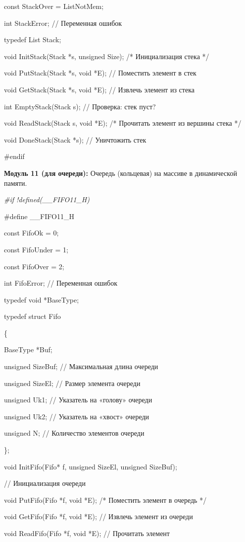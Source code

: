 \documentclass[12pt]{article}
\begin{document}
{{		const StackOver = ListNotMem;
		
		int   StackError; // Переменная ошибок
		
		typedef List Stack;
		
		void InitStack(Stack *s, unsigned Size);  /* Инициализация стека */
		
		void PutStack(Stack *s, void *E); // Поместить элемент в стек      
		
		void GetStack(Stack *s, void *E); // Извлечь элемент из стека  
		
		int EmptyStack(Stack s);  // Проверка: стек пуст?
		
		void ReadStack(Stack s, void *E);  /* Прочитать элемент из вершины стека */
		
		void DoneStack(Stack *s); // Уничтожить стек
		
		\#endif}
	
	{\bf Модуль 11 (для очереди):} Очередь (кольцевая) на массиве в динамической памяти.
	
	{\it \#if !defined(\_\_FIFO11\_H)
		
	\#define \_\_FIFO11\_H
	
	const FifoOk = 0;
	
	const FifoUnder = 1;
	
	const FifoOver = 2;
	
	int FifoError; // Переменная ошибок
	
	typedef void *BaseType; 
	
	typedef struct Fifo
	
	\{
	
		BaseType *Buf;
	
		unsigned SizeBuf; // Максимальная длина очереди
	
		unsigned SizeEl; // Размер элемента очереди
	
		unsigned Uk1; // Указатель на «голову» очереди
	
		unsigned Uk2; // Указатель на «хвост» очереди
	
		unsigned N;   // Количество элементов очереди
	
	\};
	
	void InitFifo(Fifo* f, unsigned SizeEl, unsigned SizeBuf);    
	
	// Инициализация очереди
	
	void PutFifo(Fifo *f, void *E); /* Поместить элемент в очередь */
	
	void GetFifo(Fifo *f, void *E); // Извлечь элемент из очереди 
	
	void ReadFifo(Fifo *f, void *E);  // Прочитать элемент                  
	
}}
\end{document}
